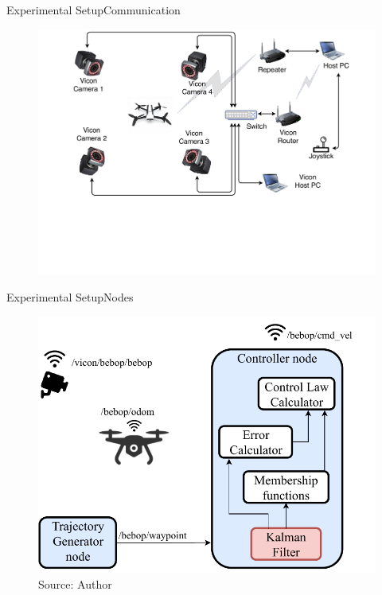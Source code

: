 
\begin{frame}{Experimental Setup}{Communication\autocite{JRSB2019}}
\begin{figure}[!htb]
	\centering \vspace{-0.4cm}
	\includegraphics[scale=0.45,trim={28mm 55mm 0 0mm},clip]{figuras/Diagram_ViconDroneDev.pdf}
	\label{fig:cont_sys}
\end{figure}

\end{frame}


\begin{frame}{Experimental Setup}{Nodes}
\begin{figure}[!htb]
	\centering
	\includegraphics[scale=0.6]{figuras/control_scheme-Page-4.pdf}
	\caption{Source: Author}
	\label{fig:control_scheme}
\end{figure}
\end{frame}


